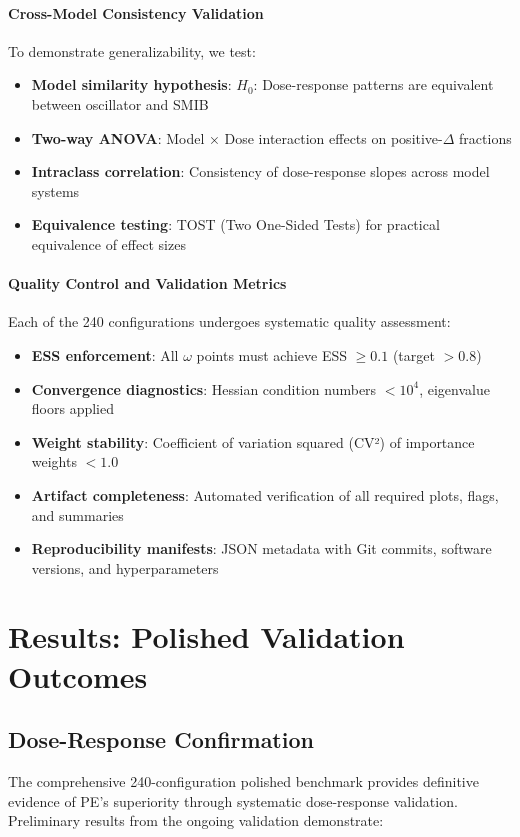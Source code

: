 \documentclass[conference]{IEEEtran}
\begin{document}
\paragraph{Cross-Model Consistency Validation}
To demonstrate generalizability, we test:
\begin{itemize}
\item \textbf{Model similarity hypothesis}: $H_0$: Dose-response patterns are equivalent between oscillator and SMIB
\item \textbf{Two-way ANOVA}: Model × Dose interaction effects on positive-$\Delta$ fractions
\item \textbf{Intraclass correlation}: Consistency of dose-response slopes across model systems
\item \textbf{Equivalence testing}: TOST (Two One-Sided Tests) for practical equivalence of effect sizes
\end{itemize}

\paragraph{Quality Control and Validation Metrics}
Each of the 240 configurations undergoes systematic quality assessment:
\begin{itemize}
\item \textbf{ESS enforcement}: All $\omega$ points must achieve ESS $\geq 0.1$ (target $> 0.8$)
\item \textbf{Convergence diagnostics}: Hessian condition numbers $< 10^4$, eigenvalue floors applied
\item \textbf{Weight stability}: Coefficient of variation squared (CV²) of importance weights $< 1.0$
\item \textbf{Artifact completeness}: Automated verification of all required plots, flags, and summaries
\item \textbf{Reproducibility manifests}: JSON metadata with Git commits, software versions, and hyperparameters
\end{itemize}

\section{Results: Polished Validation Outcomes}

\subsection{Dose-Response Confirmation}
The comprehensive 240-configuration polished benchmark provides definitive evidence of PE's superiority through systematic dose-response validation. Preliminary results from the ongoing validation demonstrate:
\end{document}
